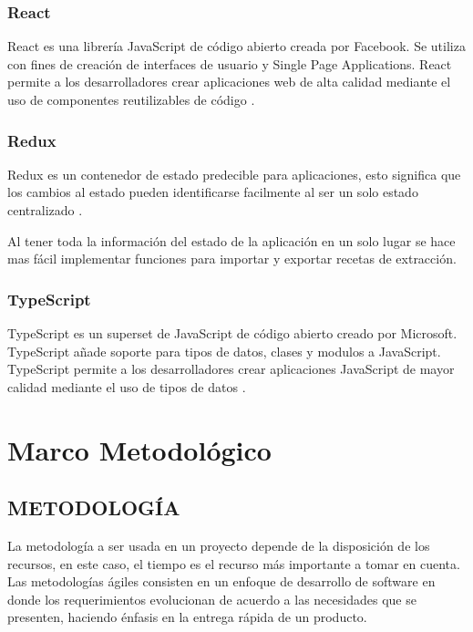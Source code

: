 \documentclass[12pt]{report}
\begin{document}
\subsection{React}

React es una librería JavaScript de código abierto creada por Facebook. Se utiliza con fines de creación de interfaces de usuario y Single Page Applications. React permite a los desarrolladores crear aplicaciones web de alta calidad mediante el uso de componentes reutilizables de código \cite{aggarwal2018modern}.

\subsection{Redux}

Redux es un contenedor de estado predecible para aplicaciones, esto significa que los cambios al estado pueden identificarse facilmente al ser un solo estado centralizado \cite{caspers2017react} .

Al tener toda la información del estado de la aplicación en un solo lugar se hace mas fácil implementar funciones para importar y exportar recetas de extracción.

\subsection{TypeScript}

TypeScript es un superset de JavaScript de código abierto creado por Microsoft. TypeScript añade soporte para tipos de datos, clases y modulos a JavaScript. TypeScript permite a los desarrolladores crear aplicaciones JavaScript de mayor calidad mediante el uso de tipos de datos \cite{typescript2022}.


\chapter{Marco Metodológico}

\section[Metodología]{METODOLOGÍA}

La metodología a ser usada en un proyecto depende de la disposición de los recursos, en este caso, el tiempo es el recurso más importante a tomar en cuenta. Las metodologías ágiles consisten en un enfoque de desarrollo de software en donde los requerimientos evolucionan de acuerdo a las necesidades que se presenten, haciendo énfasis en la entrega rápida de un producto.
\end{document}
